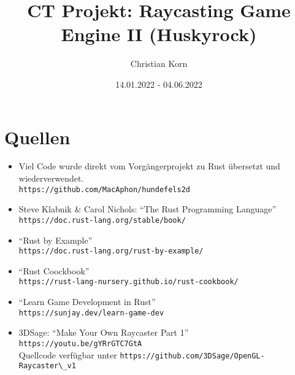 \documentclass[a4paper,titlepage]{article}
\title{CT Projekt: Raycasting Game Engine II (Huskyrock)}
\author{Christian Korn}
\date{14.01.2022 - 04.06.2022}
\begin{document}
	\maketitle
	\tableofcontents
	
	\newpage
	
	\section{Quellen}
	
	\begin{itemize}
		\item Viel Code wurde direkt vom Vorgängerprojekt zu Rust übersetzt und wiederverwendet. \\
		\verb|https://github.com/MacAphon/hundefels2d|
		
		\item Steve Klabnik \& Carol Nichols: ``The Rust Programming Language'' \\
		\verb|https://doc.rust-lang.org/stable/book/|
		
		\item ``Rust by Example'' \\
		\verb|https://doc.rust-lang.org/rust-by-example/|
		
		\item ``Rust Coockbook'' \\
		\verb|https://rust-lang-nursery.github.io/rust-cookbook/|
		
		\item ``Learn Game Development in Rust'' \\
		\verb|https://sunjay.dev/learn-game-dev|
		
		\item 3DSage: ``Make Your Own Raycaster Part 1'' \\ \verb|https://youtu.be/gYRrGTC7GtA|\\ 
		Quellcode verfügbar unter \verb|https://github.com/3DSage/OpenGL-Raycaster\_v1|
	\end{itemize}
\end{document}
